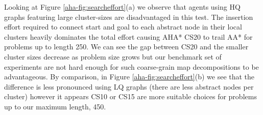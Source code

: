 \par \indent
Looking at Figure \ref{aha-fig:searcheffort}(a) we observe that agents using HQ graphs featuring large cluster-sizes are disadvantaged in this test. 
The insertion effort required to connect start and goal to each abstract node in their local clusters heavily dominates the total effort causing AHA* CS20 to trail AA* for problems up to length 250.
We can see the gap between CS20 and the smaller cluster sizes decrease as problem size grows but our benchmark set of experiments are not hard enough for such coarse-grain map decompositions to be advantageous. 
By comparison, in Figure \ref{aha-fig:searcheffort}(b) we see that the difference is less pronounced using LQ graphs (there are less abstract nodes per cluster) however it appears CS10 or CS15 are more suitable choices for problems up to our maximum length, 450.
